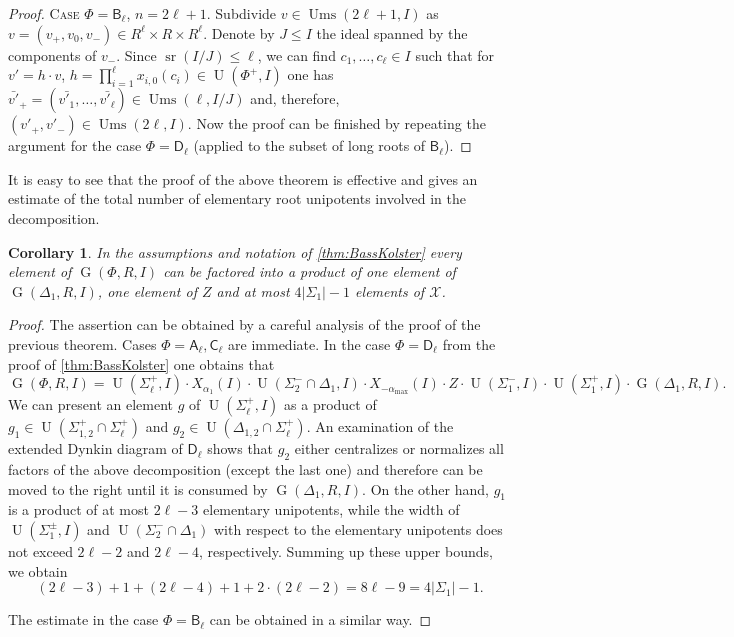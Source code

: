 \documentclass[11pt]{amsart}
\theoremstyle{plain}
\numberwithin{equation}{section}
\numberwithin{lemma}{section}
\newtheorem{cor}[lemma]{Corollary}
\theoremstyle{definition}
\theoremstyle{remark}
\DeclareMathOperator{\G}{G}
\DeclareMathOperator{\U}{U}
\DeclareMathOperator{\sr}{sr}
\DeclareMathOperator{\Ums}{Ums}
\newcommand{\rA}{\mathsf{A}}
\newcommand{\rB}{\mathsf{B}}
\newcommand{\rC}{\mathsf{C}}
\newcommand{\rD}{\mathsf{D}}
\begin{document}
\begin{proof}
\textsc{Case $\Phi=\rB_\ell$, $n=2\ell+1$.} Subdivide $v\in \Ums(2\ell+1, I)$ as $v=(v_+, v_0, v_-)\in R^\ell\times R\times R^\ell$.
Denote by $J\leqslant I$ the ideal spanned by the components of $v_-$.
Since $\sr(I/J)\leqslant \ell$, we can find $c_1, \dots, c_\ell\in I$ such that for $v' = h \cdot v$, $h = \prod_{i=1}^\ell x_{i, 0}(c_i) \in \U(\Phi^+, I)$
one has $\bar{v'}_+=(\bar{v'_1}, \ldots, \bar{v'_\ell}) \in \Ums(\ell, I/J)$ and, therefore, $(v'_+, v'_-) \in \Ums(2\ell, I)$.
Now the proof can be finished by repeating the argument for the case $\Phi=\rD_\ell$ (applied to the subset of long roots of $\rB_\ell$).
\end{proof}

It is easy to see that the proof of the above theorem is effective and gives an estimate of the total number of elementary root unipotents involved in the decomposition.
\begin{cor}\label{cor:bass-kolster-count}
In the assumptions and notation of \cref{thm:BassKolster} every element of $\G(\Phi, R, I)$ 
can be factored into a product of one element of $\G(\Delta_1, R, I)$, one element of $Z$ and at most $4|\Sigma_1|-1$ elements of $\mathcal{X}$.
\end{cor}
\begin{proof}
The assertion can be obtained by a careful analysis of the proof of the previous theorem.
Cases $\Phi=\rA_\ell, \rC_\ell$ are immediate.
In the case $\Phi=\rD_\ell$ from the proof of \cref{thm:BassKolster} one obtains that
\begin{equation*} \G(\Phi, R, I) =  \U(\Sigma_\ell^+, I) \cdot X_{\alpha_1}(I) \cdot \U(\Sigma_2^-\cap\Delta_1, I) \cdot X_{-\alpha_{\max}}(I) \cdot Z \cdot \U(\Sigma_1^-, I) \cdot \U(\Sigma_1^+, I) \cdot \G(\Delta_1, R, I). \end{equation*}
We can present an element $g$ of $\U(\Sigma_\ell^+, I)$ as a product of $g_1 \in \U(\Sigma_{1, 2}^+ \cap \Sigma_\ell^+)$ and $g_2\in \U(\Delta_{1, 2}\cap \Sigma_\ell^+)$.
An examination of the extended Dynkin diagram of $\rD_\ell$ shows that $g_2$ either centralizes or normalizes all factors of the above decomposition (except the last one)
and therefore can be moved to the right until it is consumed by $\G(\Delta_1, R, I)$.
On the other hand, $g_1$ is a product of at most $2\ell-3$ elementary unipotents, while the width of $\U(\Sigma_1^\pm, I)$ and $\U(\Sigma_2^-\cap\Delta_1)$ with respect to the elementary unipotents does not exceed $2\ell-2$ and $2\ell-4$, respectively.
Summing up these upper bounds, we obtain
$$(2\ell-3) + 1 + (2\ell - 4) + 1 + 2\cdot (2\ell - 2) = 8\ell - 9 = 4|\Sigma_1| - 1.$$

The estimate in the case $\Phi=\rB_\ell$ can be obtained in a similar way. \end{proof}
\end{document}
